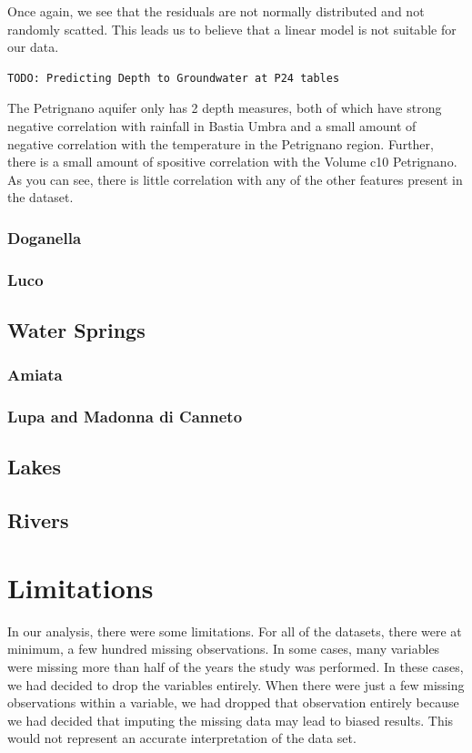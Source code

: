 \documentclass[12pt, letterpaper]{article}
\begin{document}
Once again, we see that the residuals are not normally distributed and not randomly scatted. This leads us to believe that a linear model is not suitable for our data.

\begin{verbatim}
TODO: Predicting Depth to Groundwater at P24 tables
\end{verbatim}

The Petrignano aquifer only has 2 depth measures, both of which have strong negative correlation with rainfall in Bastia Umbra and a small amount of negative correlation with the temperature in the Petrignano region. Further, there is a small amount of spositive correlation with the Volume c10 Petrignano. As you can see, there is little correlation with any of the other features present in the dataset.

\subsubsection{Doganella}

\subsubsection{Luco}

\subsection{Water Springs}
\subsubsection{Amiata}

\subsubsection{Lupa and Madonna di Canneto}

\subsection{Lakes}
\subsection{Rivers}

\section{Limitations}
In our analysis, there were some limitations. For all of the datasets, there were at minimum, a few hundred missing observations. In some cases, many variables were missing more than half of the years the study was performed. In these cases, we had decided to drop the variables entirely. When there were just a few missing observations within a variable, we had dropped that observation entirely because we had decided that imputing the missing data may lead to biased results. This would not represent an accurate interpretation of the data set.
\end{document}
